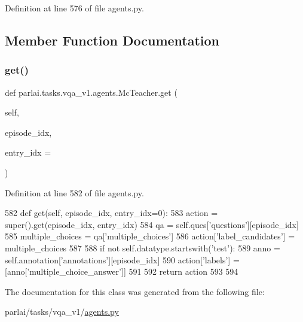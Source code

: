 Definition at line 576 of file agents.\+py.



\subsection{Member Function Documentation}
\mbox{\label{classparlai_1_1tasks_1_1vqa__v1_1_1agents_1_1McTeacher_acfe24f89d048cb6e8ccd745838223f07}} 
\subsubsection{\texorpdfstring{get()}{get()}}
{\footnotesize\ttfamily def parlai.\+tasks.\+vqa\+\_\+v1.\+agents.\+Mc\+Teacher.\+get (\begin{DoxyParamCaption}\item[{}]{self,  }\item[{}]{episode\+\_\+idx,  }\item[{}]{entry\+\_\+idx = {} }\end{DoxyParamCaption})}



Definition at line 582 of file agents.\+py.


\begin{DoxyCode}
582     \textcolor{keyword}{def }get(self, episode\_idx, entry\_idx=0):
583         action = super().get(episode\_idx, entry\_idx)
584         qa = self.ques[\textcolor{stringliteral}{'questions'}][episode\_idx]
585         multiple\_choices = qa[\textcolor{stringliteral}{'multiple\_choices'}]
586         action[\textcolor{stringliteral}{'label\_candidates'}] = multiple\_choices
587 
588         \textcolor{keywordflow}{if} \textcolor{keywordflow}{not} self.datatype.startswith(\textcolor{stringliteral}{'test'}):
589             anno = self.annotation[\textcolor{stringliteral}{'annotations'}][episode\_idx]
590             action[\textcolor{stringliteral}{'labels'}] = [anno[\textcolor{stringliteral}{'multiple\_choice\_answer'}]]
591 
592         \textcolor{keywordflow}{return} action
593 
594 
\end{DoxyCode}


The documentation for this class was generated from the following file\+:\begin{DoxyCompactItemize}
\item 
parlai/tasks/vqa\+\_\+v1/\hyperlink{parlai_2tasks_2vqa__v1_2agents_8py}{agents.\+py}\end{DoxyCompactItemize}
